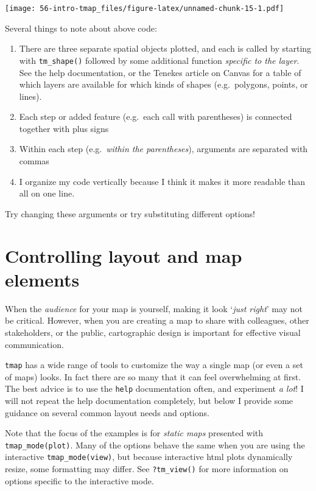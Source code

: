 \documentclass[
]{book}
\providecommand{\tightlist}{%
  \setlength{\itemsep}{0pt}\setlength{\parskip}{0pt}}
\begin{document}
\texttt{[image: 56-intro-tmap\_files/figure-latex/unnamed-chunk-15-1.pdf]}

Several things to note about above code:

\begin{enumerate}
\def\labelenumi{\arabic{enumi}.}
\tightlist
\item
  There are three separate spatial objects plotted, and each is called by starting with \texttt{tm\_shape()} followed by some additional function \emph{specific to the layer}. See the help documentation, or the Tenekes article on Canvas for a table of which layers are available for which kinds of shapes (e.g.~polygons, points, or lines).
\item
  Each step or added feature (e.g.~each call with parentheses) is connected together with plus signs
\item
  Within each step (e.g.~\emph{within the parentheses}), arguments are separated with commas
\item
  I organize my code vertically because I think it makes it more readable than all on one line.
\end{enumerate}

Try changing these arguments or try substituting different options!

\hypertarget{controlling-layout-and-map-elements}{%
\section{Controlling layout and map elements}\label{controlling-layout-and-map-elements}}

When the \emph{audience} for your map is yourself, making it look `\emph{just right}' may not be critical. However, when you are creating a map to share with colleagues, other stakeholders, or the public, cartographic design is important for effective visual communication.

\texttt{tmap} has a wide range of tools to customize the way a single map (or even a set of maps) looks. In fact there are so many that it can feel overwhelming at first. The best advice is to use the \texttt{help} documentation often, and experiment \emph{a lot}! I will not repeat the help documentation completely, but below I provide some guidance on several common layout needs and options.

Note that the focus of the examples is for \emph{static maps} presented with \texttt{tmap\_mode(\textquotesingle{}plot\textquotesingle{})}. Many of the options behave the same when you are using the interactive \texttt{tmap\_mode(\textquotesingle{}view\textquotesingle{})}, but because interactive html plots dynamically resize, some formatting may differ. See \texttt{?tm\_view()} for more information on options specific to the interactive mode.
\end{document}
